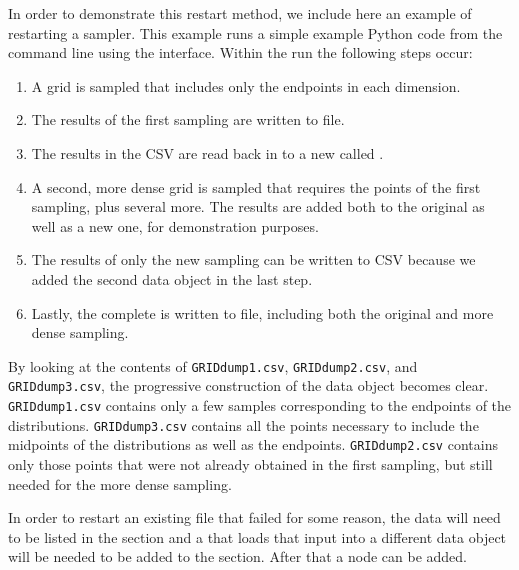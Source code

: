 In order to demonstrate this restart method, we include here an example of restarting a 
sampler.  This example runs a simple example Python code from the command line using the 
interface.  Within the run the following steps occur:
\begin{enumerate}
  \item A grid is sampled that includes only the endpoints in each dimension.
  \item The results of the first sampling are written to file.
  \item The results in the CSV are read back in to a new  called .
  \item A second, more dense grid is sampled that requires the points of the first sampling, plus several
    more.  The results are added both to the original  as well as a new one, for
    demonstration purposes.
  \item The results of only the new sampling can be written to CSV because we added the second data object in
    the last step.
  \item Lastly, the complete  is written to file, including both the original and more
    dense sampling.
\end{enumerate}
By looking at the contents of \texttt{GRIDdump1.csv}, \texttt{GRIDdump2.csv}, and \texttt{GRIDdump3.csv}, the
progressive construction of the data object becomes clear.  \texttt{GRIDdump1.csv} contains only a few samples
corresponding to the endpoints of the distributions.  \texttt{GRIDdump3.csv} contains all the points necessary
to include the midpoints of the distributions as well as the endpoints.  \texttt{GRIDdump2.csv} contains only
those points that were not already obtained in the first sampling, but still needed for the more dense
sampling.


In order to restart an existing file that failed for some reason, the
data will need to be listed in the  section and a
 that loads that input into a different data object
will be needed to be added to the  section. After that a  node can be added.



